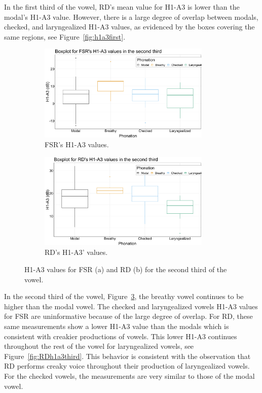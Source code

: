 \documentclass[12pt, letterpaper]{article}
\begin{document}
In the first third of the vowel, RD's mean value for H1-A3 is lower than the modal's H1-A3 value. However, there is a large degree of overlap between modals, checked, and laryngealized H1-A3 values, as evidenced by the boxes covering the same regions, see Figure~\ref{fig:h1a3first}. 

\begin{figure}[!h]
	\centering
	\begin{subfigure}{.5\textwidth}
		\centering
		\includegraphics[width=0.9\textwidth]{../mean_FSR_h1a3_Second.png}
		\caption{FSR's H1-A3 values.}
		\label{fig:FSRh1a3second} 
	\end{subfigure}%
	\begin{subfigure}{.5\textwidth}
		\centering
		\includegraphics[width=0.9\textwidth]{../mean_RD_h1a3_Second.png}
		\caption{RD's H1-A3' values.}
		\label{fig:RDh1a3second} 
	\end{subfigure}
	\caption{H1-A3 values for FSR (a) and RD (b) for the second third of the vowel. }
	\label{fig:h1a3second}
\end{figure}

In the second third of the vowel, Figure~\ref{fig:h1a3second}, the breathy vowel continues to be higher than the modal vowel. The checked and laryngealized vowels H1-A3 values for FSR are uninformative because of the large degree of overlap. For RD, these same measurements show a lower H1-A3 value than the modals which is consistent with creakier productions of vowels. This lower H1-A3 continues throughout the rest of the vowel for laryngealized vowels, see Figure~\ref{fig:RDh1a3third}. This behavior is consistent with the observation that RD performs creaky voice throughout their production of laryngealized vowels. For the checked vowels, the measurements are very similar to those of the modal vowel. 
\end{document}
